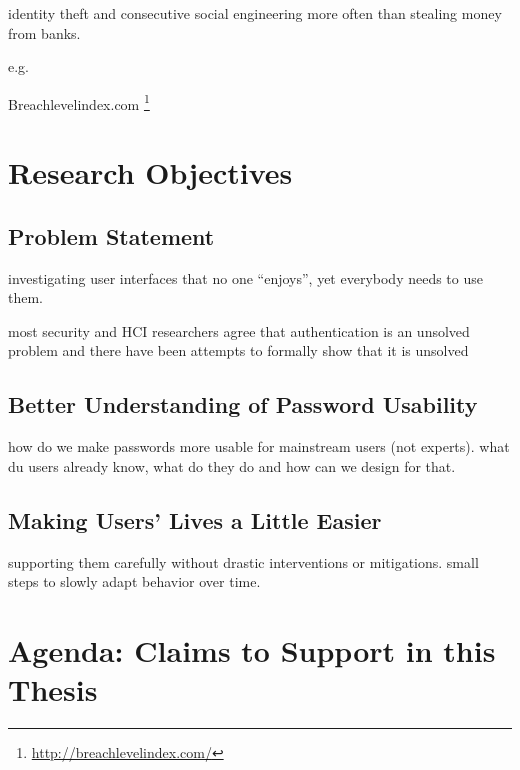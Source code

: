 identity theft and consecutive social engineering more often than stealing money from banks.

 e.g. \cite{CSID2012PasswordHabits} 

Breachlevelindex.com \footnote{\url{http://breachlevelindex.com/}}

\section{Research Objectives}

\subsection{Problem Statement}
investigating user interfaces that no one ``enjoys'', yet everybody needs to use them. 

most security and HCI researchers agree that authentication is an unsolved problem and there have been attempts to formally show that it is unsolved 

\subsection{Better Understanding of Password Usability}
how do we make passwords more usable for mainstream users (not experts). what du users already know, what do they do and how can we design for that. 

\subsection{Making Users' Lives a Little Easier}
supporting them carefully without drastic interventions or mitigations. small steps to slowly adapt behavior over time. 

\section{Agenda: Claims to Support in this Thesis}

